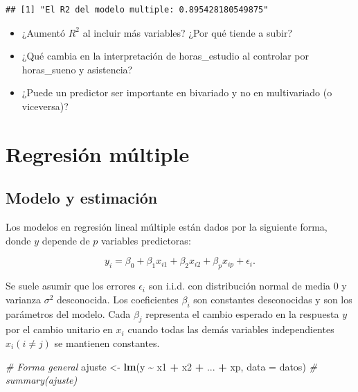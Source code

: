 \documentclass[
]{book}
\newenvironment{Shaded}{\begin{snugshade}}{\end{snugshade}}
\newcommand{\AttributeTok}[1]{\textcolor[rgb]{0.13,0.29,0.53}{#1}}
\newcommand{\CommentTok}[1]{\textcolor[rgb]{0.56,0.35,0.01}{\textit{#1}}}
\newcommand{\FunctionTok}[1]{\textcolor[rgb]{0.13,0.29,0.53}{\textbf{#1}}}
\newcommand{\NormalTok}[1]{#1}
\newcommand{\OtherTok}[1]{\textcolor[rgb]{0.56,0.35,0.01}{#1}}
\newcommand{\SpecialCharTok}[1]{\textcolor[rgb]{0.81,0.36,0.00}{\textbf{#1}}}
\providecommand{\tightlist}{%
  \setlength{\itemsep}{0pt}\setlength{\parskip}{0pt}}
\begin{document}
\begin{verbatim}
## [1] "El R2 del modelo multiple: 0.895428180549875"
\end{verbatim}

\begin{Shaded}
\end{Shaded}

\begin{itemize}
\tightlist
\item
  ¿Aumentó \(R^2\) al incluir más variables? ¿Por qué tiende a subir?
\item
  ¿Qué cambia en la interpretación de horas\_estudio al controlar por horas\_sueno y asistencia?
\item
  ¿Puede un predictor ser importante en bivariado y no en multivariado (o viceversa)?
\end{itemize}

\section{Regresión múltiple}\label{regresiuxf3n-muxfaltiple-1}

\subsection{Modelo y estimación}\label{modelo-y-estimaciuxf3n}

Los modelos en regresión lineal múltiple están dados por la siguiente forma, donde \(y\) depende de \(p\) variables predictoras:

\[y_i=\beta_0+\beta_1x_{i1}+\beta_2x_{i2} + \beta_px_{ip}+\epsilon_i.\]

Se suele asumir que los errores \(\epsilon_i\) son i.i.d. con distribución normal de media 0 y varianza \(\sigma^2\) desconocida. Los coeficientes \(\beta_i\) son constantes desconocidas y son los parámetros del modelo. Cada \(\beta_j\) representa el cambio esperado en la respuesta \(y\) por el cambio unitario en \(x_i\) cuando todas las demás variables independientes \(x_i(i\neq j)\) se mantienen constantes.

\begin{Shaded}
\begin{Highlighting}[]
\CommentTok{\# Forma general}
\NormalTok{ajuste }\OtherTok{\textless{}{-}} \FunctionTok{lm}\NormalTok{(y }\SpecialCharTok{\textasciitilde{}}\NormalTok{ x1 }\SpecialCharTok{+}\NormalTok{ x2 }\SpecialCharTok{+}\NormalTok{ ... }\SpecialCharTok{+}\NormalTok{ xp, }\AttributeTok{data =}\NormalTok{ datos)}
\CommentTok{\# summary(ajuste)}
\end{Highlighting}
\end{Shaded}
\end{document}
